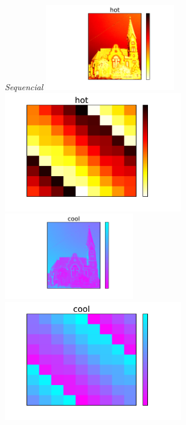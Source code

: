 \documentclass{beamer}
\begin{document}
\begin{frame}
\begin{columns}
\begin{column}{0.5\textwidth}
\begin{center}
\textit{Sequencial}
\vfill
\includegraphics[width=0.42\textwidth]{../church_hot.pdf}
\includegraphics[width=0.58\textwidth]{../magicsquare_hot.pdf}\newline\newline
\vfill
\includegraphics[width=0.42\textwidth]{../church_cool.pdf}
\includegraphics[width=0.58\textwidth]{../magicsquare_cool.pdf}
\vfill
\end{center}
\end{column}
\end{columns}
\end{frame}
\end{document}
